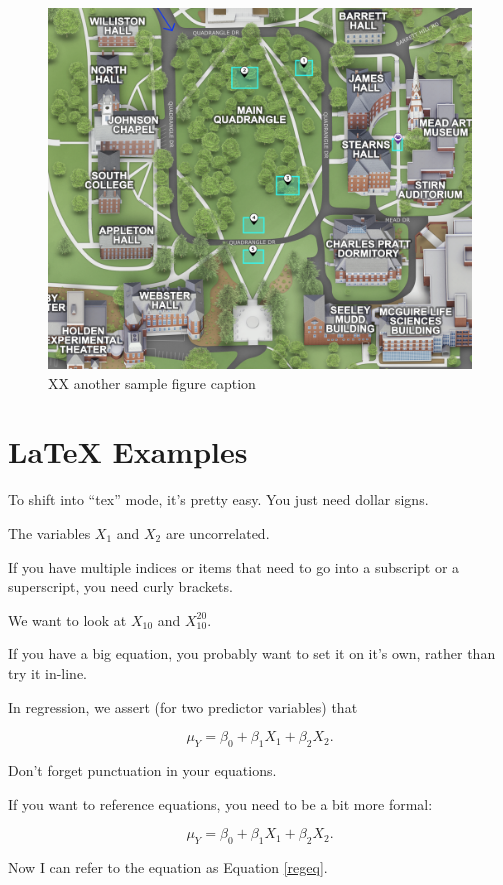 \documentclass[12pt]{article}
\begin{document}
\begin{figure}
\includegraphics[width=0.8\linewidth]{gfx/campus_map} \caption{XX another sample figure caption}\label{fig:sample-fig2}
\end{figure}

\hypertarget{latex-examples}{%
\section{LaTeX Examples}\label{latex-examples}}

To shift into ``tex'' mode, it's pretty easy. You just need dollar
signs.

The variables \(X_1\) and \(X_2\) are uncorrelated.

If you have multiple indices or items that need to go into a subscript
or a superscript, you need curly brackets.

We want to look at \(X_{10}\) and \(X_{10}^{20}\).

If you have a big equation, you probably want to set it on it's own,
rather than try it in-line.

In regression, we assert (for two predictor variables) that

\[
\mu_Y = \beta_0 + \beta_1X_1 + \beta_2X_2.
\]

Don't forget punctuation in your equations.

If you want to reference equations, you need to be a bit more formal:

\begin{equation}
\label{regeq}
\mu_Y = \beta_0 + \beta_1X_1 + \beta_2X_2.
\end{equation}

Now I can refer to the equation as Equation \ref{regeq}.
\end{document}
